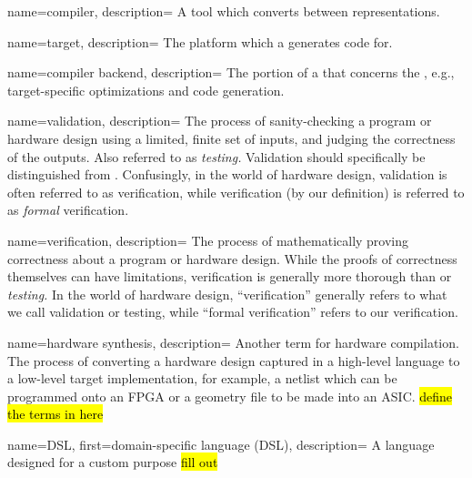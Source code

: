 
\DeclareRobustCommand{\glossfirstformat}[1]{\textit{#1}}
\renewcommand*{\glsdisplayfirst}[4]{\glossfirstformat{#1#4}}
\usepackage[normalem]{ulem}
\renewcommand*{\glstextformat}[1]{\color{lightgray}{\dotuline{\color{black} #1}}}


\makenoidxglossaries


{
    name=compiler,
    description={
A tool which converts between representations.
    }
}


{
    name=target,
    description={
The platform which a  generates code for.
    }
}

{
    name=compiler backend,
    description={
The portion of a  that concerns the ,
  e.g., target-specific optimizations and code generation.
    }
}

{
    name=validation,
    description={
The process of sanity-checking a program or hardware design using a
  limited, finite set
  of inputs, and judging the correctness 
  of the outputs.
Also referred to as \textit{testing.}
Validation should specifically be distinguished from
  .
Confusingly, 
  in the world of hardware design,
  validation is often referred to as
  verification,
  while verification (by our definition)
  is referred to as \textit{formal} verification.
    }
}

{
    name=verification,
    description={
The process of mathematically proving correctness
  about a program or hardware design.
While the proofs of correctness themselves
  can have limitations,
  verification is generally more thorough
  than  or \textit{testing.}
In the world of hardware design,
  ``verification''
  generally refers to what we call validation or testing,
  while ``formal verification''
  refers to our verification.
    }
}

{
    name={hardware synthesis},
    description={
Another term for hardware compilation.
The process of converting a hardware design
  captured in a high-level language
  to a low-level target implementation,
  for example,
  a netlist which can be programmed onto an FPGA
  or a geometry file to be made into an ASIC.
  \hl{define the terms in here}
    }
}

{
    name={DSL},
    first={domain-specific language (DSL)},
    description={
A language designed for a custom purpose \hl{fill out}
    }
}